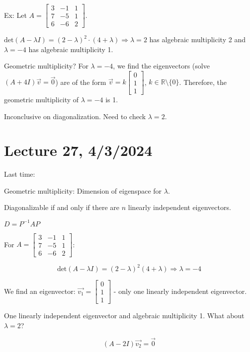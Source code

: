 \documentclass{article}
\begin{document}
Ex: Let \( A = \begin{bmatrix} 3 & -1 & 1 \\ 7 & -5 & 1 \\ 6 & -6 & 2 \end{bmatrix} \). 

\( \text{det}(A - \lambda I) = (2 - \lambda)^2 \cdot (4 + \lambda) \Rightarrow \lambda = 2 \) has algebraic multiplicity 2 and \( \lambda = -4 \) has algebraic multiplicity 1.

Geometric multiplicity? For \( \lambda = -4 \), we find the eigenvectors (solve \( (A + 4I) \vec{v} = \vec{0} \)) are of the form \( \vec{v} = k\begin{bmatrix} 0 \\ 1 \\ 1 \end{bmatrix} \), \( k \in \mathbb{R} \setminus \{0\} \). Therefore, the geometric multiplicity of \( \lambda = -4 \) is 1. 

Inconclusive on diagonalization. Need to check \( \lambda = 2 \).

\section{Lecture 27, 4/3/2024}

Last time: 

Geometric multiplicity: Dimension of eigenspace for \( \lambda \).

Diagonalizable if and only if there are \( n \) linearly independent eigenvectors.

\( D = P^{-1}AP \)

For \( A = \begin{bmatrix} 3 & -1 & 1 \\ 7 & -5 & 1 \\ 6 & -6 & 2 \end{bmatrix} \):

\[ \text{det}(A - \lambda I) = (2 - \lambda)^2(4 + \lambda) \Rightarrow \lambda = -4 \]

We find an eigenvector: \( \vec{v_1} = \begin{bmatrix} 0 \\ 1 \\ 1 \end{bmatrix} \) - only one linearly independent eigenvector.

One linearly independent eigenvector and algebraic multiplicity 1. What about \( \lambda = 2 \)? 

\[ (A - 2I)\vec{v_2} = \vec{0} \]
\end{document}
